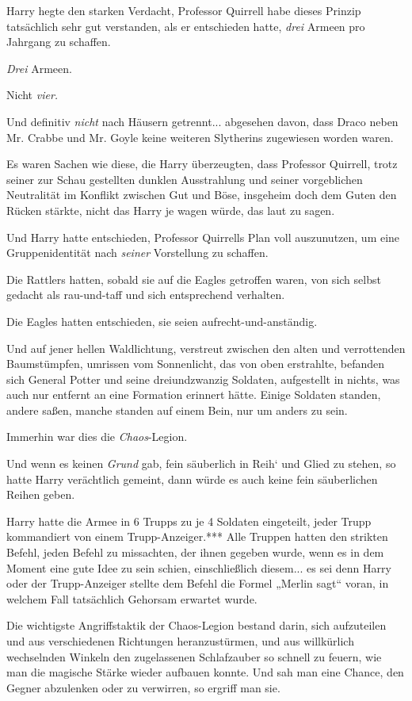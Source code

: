 {Harry hegte den starken Verdacht, Professor Quirrell habe dieses Prinzip tatsächlich sehr gut verstanden, als er entschieden hatte, \emph{drei} Armeen pro Jahrgang zu schaffen.

\emph{Drei} Armeen.

Nicht \emph{vier.}

Und definitiv \emph{nicht} nach Häusern getrennt... abgesehen davon, dass Draco neben Mr. Crabbe und Mr. Goyle keine weiteren Slytherins zugewiesen worden waren.

Es waren Sachen wie diese, die Harry überzeugten, dass Professor Quirrell, trotz seiner zur Schau gestellten dunklen Ausstrahlung und seiner vorgeblichen Neutralität im Konflikt zwischen Gut und Böse, insgeheim doch dem Guten den Rücken stärkte, nicht das Harry je wagen würde, das laut zu sagen.

Und Harry hatte entschieden, Professor Quirrells Plan voll auszunutzen, um eine Gruppenidentität nach \emph{seiner} Vorstellung zu schaffen.

Die Rattlers hatten, sobald sie auf die Eagles getroffen waren, von sich selbst gedacht als rau-und-taff und sich entsprechend verhalten.

Die Eagles hatten entschieden, sie seien aufrecht-und-anständig.

Und auf jener hellen Waldlichtung, verstreut zwischen den alten und verrottenden Baumstümpfen, umrissen vom Sonnenlicht, das von oben erstrahlte, befanden sich General Potter und seine dreiundzwanzig Soldaten, aufgestellt in nichts, was auch nur entfernt an eine Formation erinnert hätte. Einige Soldaten standen, andere saßen, manche standen auf einem Bein, nur um anders zu sein.

Immerhin war dies die \emph{Chaos}-Legion.

Und wenn es keinen \emph{Grund} gab, fein säuberlich in Reih` und Glied zu stehen, so hatte Harry verächtlich gemeint, dann würde es auch keine fein säuberlichen Reihen geben.

Harry hatte die Armee in 6 Trupps zu je 4 Soldaten eingeteilt, jeder Trupp kommandiert von einem Trupp-Anzeiger.*** Alle Truppen hatten den strikten Befehl, jeden Befehl zu missachten, der ihnen gegeben wurde, wenn es in dem Moment eine gute Idee zu sein schien, einschließlich diesem... es sei denn Harry oder der Trupp-Anzeiger stellte dem Befehl die Formel „Merlin sagt“ voran, in welchem Fall tatsächlich Gehorsam erwartet wurde.

Die wichtigste Angriffstaktik der Chaos-Legion bestand darin, sich aufzuteilen und aus verschiedenen Richtungen heranzustürmen, und aus willkürlich wechselnden Winkeln den zugelassenen Schlafzauber so schnell zu feuern, wie man die magische Stärke wieder aufbauen konnte. Und sah man eine Chance, den Gegner abzulenken oder zu verwirren, so ergriff man sie.

}
